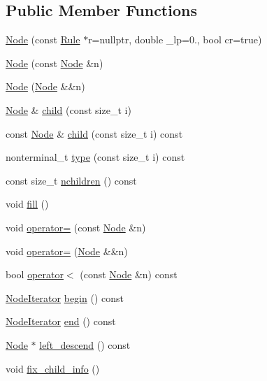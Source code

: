 \subsection*{Public Member Functions}
\begin{DoxyCompactItemize}
\item 
\hyperlink{class_node_ae33050869651f64551da2d13ad2a9dbc}{Node} (const \hyperlink{class_rule}{Rule} $\ast$r=nullptr, double \+\_\+lp=0., bool cr=true)
\item 
\hyperlink{class_node_a277918b68827f6ffd8150f450b0c12c3}{Node} (const \hyperlink{class_node}{Node} \&n)
\item 
\hyperlink{class_node_a87c9938dcd77c169802a732c98204945}{Node} (\hyperlink{class_node}{Node} \&\&n)
\item 
\hyperlink{class_node}{Node} \& \hyperlink{class_node_a23adfa03c20f4141b1105c5b4b1bca3f}{child} (const size\+\_\+t i)
\item 
const \hyperlink{class_node}{Node} \& \hyperlink{class_node_acc2b20cdba470853f1c137e26546ed3c}{child} (const size\+\_\+t i) const
\item 
nonterminal\+\_\+t \hyperlink{class_node_aa727c354e38f60fb1560d72ae1aaa9af}{type} (const size\+\_\+t i) const
\item 
const size\+\_\+t \hyperlink{class_node_a8a7ea0e9f9bac373dbcdd427cb5ebe48}{nchildren} () const
\item 
void \hyperlink{class_node_a1c03973664fcfdfb191feb67f565168b}{fill} ()
\item 
void \hyperlink{class_node_addbfe90949f473c91203389f48095cf0}{operator=} (const \hyperlink{class_node}{Node} \&n)
\item 
void \hyperlink{class_node_abcd5c8ca2ea54716a72f7e27f9a9c937}{operator=} (\hyperlink{class_node}{Node} \&\&n)
\item 
bool \hyperlink{class_node_a8b05feb361beb04d465619751a2297b1}{operator$<$} (const \hyperlink{class_node}{Node} \&n) const
\item 
\hyperlink{class_node_1_1_node_iterator}{Node\+Iterator} \hyperlink{class_node_a319b65eca94c9438201ebda99ab90a65}{begin} () const
\item 
\hyperlink{class_node_1_1_node_iterator}{Node\+Iterator} \hyperlink{class_node_aea7c6e778d4720fb8071af71c57b1628}{end} () const
\item 
\hyperlink{class_node}{Node} $\ast$ \hyperlink{class_node_ac6d1a1d71a28168b34e9092568570738}{left\+\_\+descend} () const
\item 
void \hyperlink{class_node_a8f25f44608c0b19fe02eaf19ade9ea68}{fix\+\_\+child\+\_\+info} ()

\end{DoxyCompactItemize}
